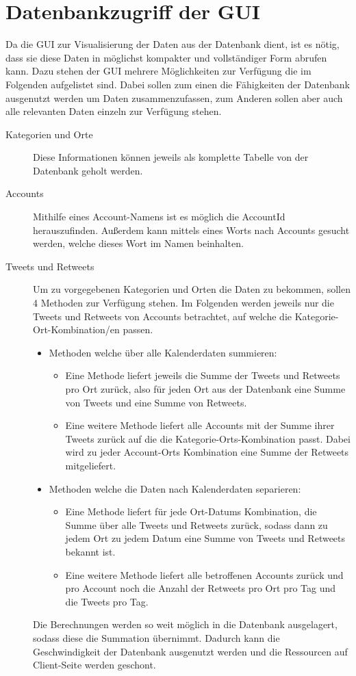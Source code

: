 \section{Datenbankzugriff der GUI}
Da die GUI zur Visualisierung der Daten aus der Datenbank dient, ist es nötig, dass sie diese Daten in möglichst kompakter und vollständiger Form abrufen kann. Dazu stehen der GUI mehrere Möglichkeiten zur Verfügung die im Folgenden aufgelistet sind. Dabei sollen zum einen die Fähigkeiten der Datenbank ausgenutzt werden um Daten zusammenzufassen, zum Anderen sollen aber auch alle relevanten Daten einzeln zur Verfügung stehen.
\begin{description}
\item[Kategorien und Orte] Diese Informationen können jeweils als komplette Tabelle von der Datenbank geholt werden.
\item[Accounts] Mithilfe eines Account-Namens ist es möglich die AccountId herauszufinden. Außerdem kann mittels eines Worts nach Accounts gesucht werden, welche dieses Wort im Namen beinhalten.
\item[Tweets und Retweets] Um zu vorgegebenen Kategorien und Orten die Daten zu bekommen, sollen 4 Methoden zur Verfügung stehen. Im Folgenden werden jeweils nur die Tweets und Retweets von Accounts betrachtet, auf welche die Kategorie-Ort-Kombination/en passen.

\begin{itemize}
	\item Methoden welche über alle Kalenderdaten summieren:
	\begin{itemize}
		\item Eine Methode liefert jeweils die Summe der Tweets und Retweets pro Ort zurück, also für jeden Ort aus der Datenbank eine Summe von Tweets und eine Summe von Retweets.
		\item Eine weitere Methode liefert alle Accounts mit der Summe ihrer Tweets zurück auf die die Kategorie-Orts-Kombination passt. Dabei wird zu jeder Account-Orts Kombination eine Summe der Retweets mitgeliefert.
	\end{itemize}
	\item Methoden welche die Daten nach Kalenderdaten separieren:
	\begin{itemize}
		\item Eine Methode liefert für jede Ort-Datums Kombination, die Summe über alle Tweets und Retweets zurück, sodass dann zu jedem Ort zu jedem Datum eine Summe von Tweets und Retweets bekannt ist.
		\item Eine weitere Methode liefert alle betroffenen Accounts zurück und pro Account noch die Anzahl der Retweets pro Ort pro Tag und die Tweets pro Tag.
	\end{itemize}
\end{itemize}
Die Berechnungen werden so weit möglich in die Datenbank ausgelagert, sodass diese die Summation übernimmt. Dadurch kann die Geschwindigkeit der Datenbank ausgenutzt werden und die Ressourcen auf Client-Seite werden geschont.


\end{description}
